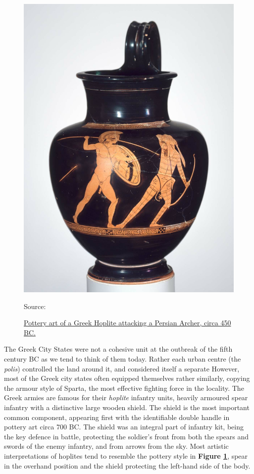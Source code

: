 \documentclass[twoside, a4paper, 12pt]{article}
\newcommand{\sourceR}[1]{\caption*{\hfill Source: {#1}} }
\begin{document}
\begin{figure}
  \centering
  \includegraphics[width=\linewidth]{HopliteArcher.jpg}
  \captionsetup{justification=raggedleft}
  \caption{\ul{ Pottery art of a Greek Hoplite attacking a Persian Archer, circa 450 BC.}}
  \sourceR{\cite{MFABoston_2017_hoplite}}
  \label{img:HopliteArcher}
\end{figure}

The Greek City States were not a cohesive unit at the outbreak of the fifth century
BC as we tend to think of them today. Rather each urban centre (the
\emph{polis}) controlled
the land around it, and considered itself a separate
However, most of the Greek city states often equipped
themselves rather similarly, copying the armour style of Sparta, the most
effective fighting force in the locality.
The Greek armies are famous for their \emph{hoplite} infantry units, heavily
armoured spear infantry with a distinctive large wooden shield. The shield is
the most important common component, appearing first with the
identifiable double handle in pottery art
circa 700 BC.\footnotemark
The shield was an integral part of infantry kit, being the key defence in battle,
protecting the soldier's front from both the spears and swords of the enemy
infantry, and from arrows from the sky.
Most artistic interpretations of hoplites tend to resemble the pottery
style in \textbf{Figure \ref{img:HopliteArcher}}, spear in the overhand
position and the shield protecting the left-hand side of the body.
\end{document}
